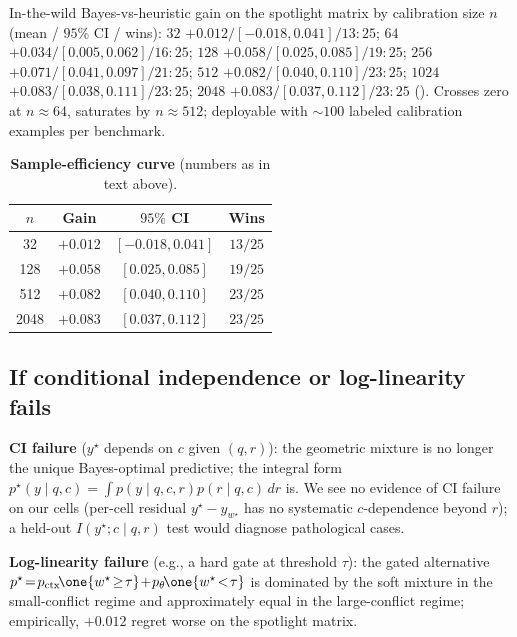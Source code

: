 In-the-wild Bayes-vs-heuristic gain on the spotlight matrix by
calibration size $n$ (mean / $95\%$ CI / wins):
$32$ $+0.012/[-0.018,0.041]/13{:}25$;
$64$ $+0.034/[0.005,0.062]/16{:}25$;
$128$ $+0.058/[0.025,0.085]/19{:}25$;
$256$ $+0.071/[0.041,0.097]/21{:}25$;
$512$ $+0.082/[0.040,0.110]/23{:}25$;
$1024$ $+0.083/[0.038,0.111]/23{:}25$;
$2048$ $+0.083/[0.037,0.112]/23{:}25$
().  Crosses zero at $n\!\approx\!64$,
saturates by $n\!\approx\!512$; deployable with $\sim\!100$ labeled
calibration examples per benchmark.

\begin{table}[H]
\centering\small
\caption{\textbf{Sample-efficiency curve} (numbers as in text above).}
\label{tab:sample-efficiency}
\begin{tabular}{cccc}
\toprule
$n$ & \textbf{Gain} & \textbf{$95\%$ CI} & \textbf{Wins}\\
\midrule
32 & $+0.012$ & $[-0.018,0.041]$ & $13/25$\\
128 & $+0.058$ & $[0.025,0.085]$ & $19/25$\\
512 & $+0.082$ & $[0.040,0.110]$ & $23/25$\\
2048 & $+0.083$ & $[0.037,0.112]$ & $23/25$\\
\bottomrule
\end{tabular}
\end{table}


\subsection{If conditional independence or log-linearity fails}
\label{app:ci-failure}\label{app:loglin-failure}

\textbf{CI failure} ($y^\star$ depends on $c$ given $(q,r)$): the
geometric mixture is no longer the unique Bayes-optimal predictive;
the integral form
$p^\star(y\!\mid\!q,c)\!=\!\int p(y\!\mid\!q,c,r)p(r\!\mid\!q,c)\,dr$
is.  We see no evidence of CI failure on our cells (per-cell
residual $y^\star\!-\!\hat y_{w^\star}$ has no systematic
$c$-dependence beyond $r$); a held-out
$I(y^\star;c\!\mid\!q,r)$ test would diagnose pathological cases.

\textbf{Log-linearity failure} (e.g., a hard gate at threshold $\tau$):
the gated alternative
$p^\star\!=\!p_\ctx\!\one{w^\star\!\ge\!\tau}\!+\!p_\theta\!\one{w^\star\!<\!\tau}$
is dominated by the soft mixture in the small-conflict regime and
approximately equal in the large-conflict regime; empirically,
$+0.012$ regret worse on the spotlight matrix.



